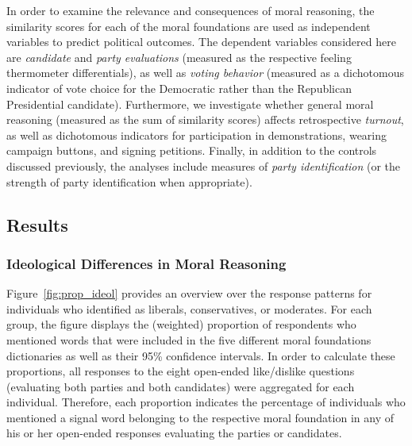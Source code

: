 \documentclass[12pt]{article}
\begin{document}
In order to examine the relevance and consequences of moral reasoning, the similarity scores for each of the moral foundations are used as independent variables to predict political outcomes. The dependent variables considered here are \textit{candidate} and \textit{party evaluations} (measured as the respective feeling thermometer differentials), as well as \textit{voting behavior} (measured as a dichotomous indicator of vote choice for the Democratic rather than the Republican Presidential candidate). Furthermore, we investigate whether general moral reasoning (measured as the sum of similarity scores) affects retrospective \textit{turnout}, as well as dichotomous indicators for participation in demonstrations, wearing campaign buttons, and signing petitions. Finally, in addition to the controls discussed previously, the analyses include measures of \textit{party identification} (or the strength of party identification when appropriate).



\subsection{Results}

\subsubsection{Ideological Differences in Moral Reasoning}

Figure~\ref{fig:prop_ideol} provides an overview over the response patterns for individuals who identified as liberals, conservatives, or moderates. For each group, the figure displays the (weighted) proportion of respondents who mentioned words that were included in the five different moral foundations dictionaries as well as their 95\% confidence intervals. In order to calculate these proportions, all responses to the eight open-ended like/dislike questions (evaluating both parties and both candidates) were aggregated for each individual. Therefore, each proportion indicates the percentage of individuals who mentioned a signal word belonging to the respective moral foundation in any of his or her open-ended responses evaluating the parties or candidates.
\end{document}
